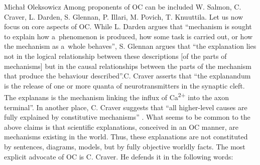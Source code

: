 \begin{artengenv}{Michał Oleksowicz}
Among proponents of OC can be included W. Salmon, C. Craver, L. Darden, S. Glennan, P. Illari, M. Povich, T. Knuuttila. Let us now focus on core aspects of OC. While L. Darden
\parencite*[][p.959]{darden_thinking_2008} %
 argues that ``mechanism is sought to explain how a~phenomenon is produced, how some task is carried out, or how the mechanism as a~whole behaves'', S. Glennan 
\parencite*[][p.S348]{glennan_rethinking_2002} %
 argues that ``the explanation lies not in the logical relationship between these descriptions [of the parts of mechanisms] but in the causal relationships between the parts of the mechanism that produce the behaviour described''.C. Craver 
\parencite*[][p.22]{craver_explaining_2007} %
 asserts that ``the explanandum is the release of one or more quanta of neurotransmitters in the synaptic cleft. The explanans is the mechanism linking the influx of Ca\textsuperscript{2+} into the axon terminal''. In another place, C. Craver suggests that ``all higher-level causes are fully explained by constitutive mechanisms'' 
\parencite[][p.548]{craver_explaining_2007}.%
What seems to be common to the above claims is that scientific explanations, conceived in an OC manner, are mechanisms existing in the world. Thus, these explanations are not constituted by sentences, diagrams, models, but by fully objective worldly facts. The most explicit advocate of OC is C. Craver. He defends it in the following words:



\end{artengenv}
